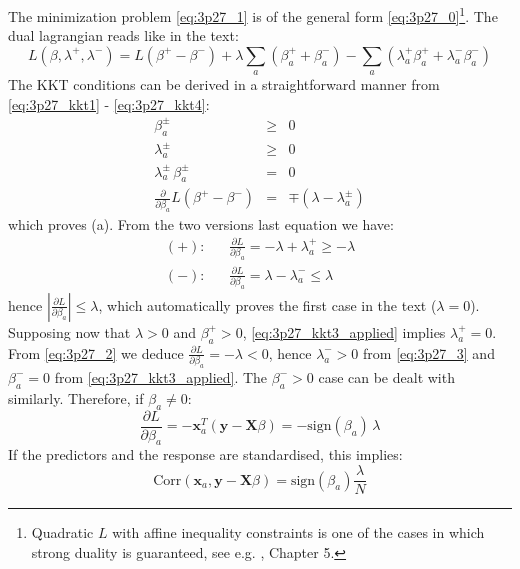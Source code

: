 The minimization problem \eqref{eq:3p27_1} is of the general form \eqref{eq:3p27_0}\footnote{Quadratic $L$ with affine inequality constraints is one of the cases
    in which strong duality is guaranteed, see e.g. \cite{Boyd2004}, Chapter 5.}.
The dual lagrangian reads like in the text:
\begin{equation*}
L(\beta, \lambda^+, \lambda^-) = L(\beta^+ - \beta^-)
    + \lambda \sum_a (\beta_a^+ + \beta_a^-) 
    - \sum_a \left(\lambda_a^+ \beta_a^+ + \lambda_a^- \beta_a^-\right)
\end{equation*}
The KKT conditions can be derived in a straightforward manner from 
\eqref{eq:3p27_kkt1} - \eqref{eq:3p27_kkt4}:
\begin{eqnarray}
    \beta_a^\pm & \geq & 0 \\
    \lambda_a^\pm & \geq & 0 \\ \label{eq:3p27_kkt3_applied}
    \lambda_a^\pm \, \beta_a^\pm & = & 0\\ 
    \frac{\partial}{\partial \beta_a} L(\beta^+ - \beta^-) & = & \mp (\lambda - \lambda_a ^\pm)
\end{eqnarray}
which proves (a). From the two versions last equation we have:
\begin{eqnarray} \label{eq:3p27_2}
    (+):&&  \frac{\partial L}{\partial \beta_a} = - \lambda + \lambda_a^+ \geq - \lambda \\ \label{eq:3p27_3}
    (-):&&  \frac{\partial L}{\partial \beta_a} = \lambda - \lambda_a^- \leq \lambda
\end{eqnarray}
hence $|\frac{\partial L}{\partial \beta_a}| \leq \lambda$, which automatically
proves the first case in the text ($\lambda = 0$). Supposing now that $\lambda > 0$
and $\beta_a^+ > 0$, \eqref{eq:3p27_kkt3_applied} implies $\lambda_a^+ = 0$. From
\eqref{eq:3p27_2} we deduce $\frac{\partial L}{\partial \beta_a} = -\lambda < 0$,
hence $\lambda_a^- > 0$ from \eqref{eq:3p27_3} and $\beta_a^- = 0$ from
\eqref{eq:3p27_kkt3_applied}. The $\beta_a^- > 0$ case can be dealt with similarly.
Therefore, if $\beta_a \neq 0$:
\begin{equation} \label{eq:3p27_4}
\frac{\partial L}{\partial \beta_a} = - \mathbf{x}_a^T \left(\mathbf{y} - \mathbf{X} \beta\right) = - \textrm{sign}(\beta_a) \, \lambda
\end{equation}
If the predictors and the response are standardised, this implies:
\begin{equation*}
\textrm{Corr}(\mathbf{x}_a, \mathbf{y} - \mathbf{X} \beta) = \textrm{sign}(\beta_a)\frac{\lambda}{N}
\end{equation*}

